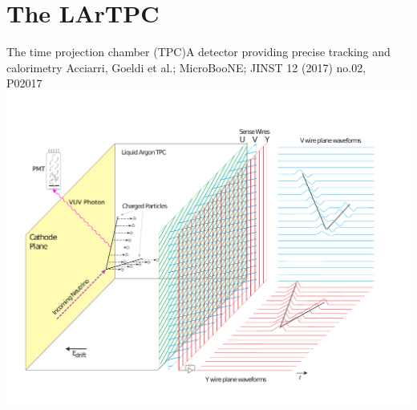 \documentclass[]{beamer}
\newcommand*{\uboone}{{MicroBooNE}}
\newcommand*{\lartpc}{{LArTPC}}
\begin{document}
\section{The \lartpc{}}

\begin{frame}{The time projection chamber (TPC)}{A detector providing precise tracking and calorimetry}
	{\tiny Acciarri, Goeldi et al.; \uboone{}; JINST 12 (2017) no.02, P02017~\cite{uboone}}\\
	\centering
	\includegraphics[viewport=35 40 720 540, clip, height=.75\textheight]{defence/TPCprinciple}
\end{frame}
\end{document}

